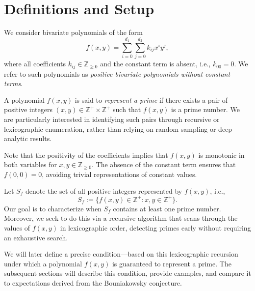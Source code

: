 \documentclass[a4paper,11pt]{article}
\begin{document}
	\section{Definitions and Setup}
	
	We consider bivariate polynomials of the form
	\[
	f(x, y) = \sum_{i=0}^{d_1} \sum_{j=0}^{d_2} k_{ij} x^i y^j,
	\]
	where all coefficients $k_{ij} \in \mathbb{Z}_{\geq 0}$ and the constant term is absent, i.e., $k_{00} = 0$. We refer to such polynomials as \textit{positive bivariate polynomials without constant terms}.
	
	A polynomial $f(x,y)$ is said to \emph{represent a prime} if there exists a pair of positive integers $(x, y) \in \mathbb{Z}^+ \times \mathbb{Z}^+$ such that $f(x, y)$ is a prime number. We are particularly interested in identifying such pairs through recursive or lexicographic enumeration, rather than relying on random sampling or deep analytic results.
	
	Note that the positivity of the coefficients implies that $f(x,y)$ is monotonic in both variables for $x, y \in \mathbb{Z}_{\geq 0}$. The absence of the constant term ensures that $f(0,0) = 0$, avoiding trivial representations of constant values.
	
	Let $S_f$ denote the set of all positive integers represented by $f(x,y)$, i.e.,
	\[
	S_f := \{ f(x, y) \in \mathbb{Z}^+ : x, y \in \mathbb{Z}^+ \}.
	\]
	Our goal is to characterize when $S_f$ contains at least one prime number. Moreover, we seek to do this via a recursive algorithm that scans through the values of $f(x,y)$ in lexicographic order, detecting primes early without requiring an exhaustive search.
	
	We will later define a precise condition—based on this lexicographic recursion under which a polynomial $f(x,y)$ is guaranteed to represent a prime. The subsequent sections will describe this condition, provide examples, and compare it to expectations derived from the Bouniakowsky conjecture.
	
\end{document}
